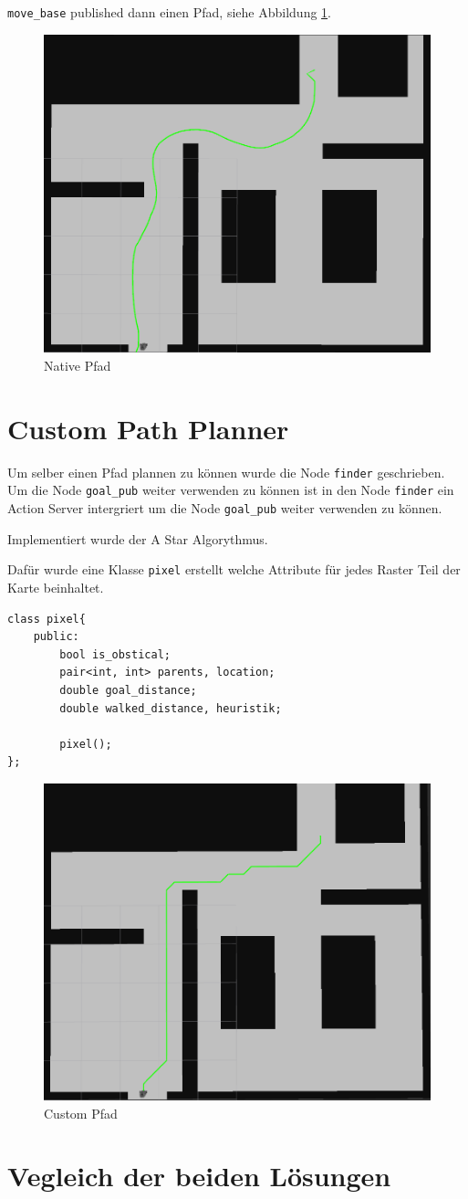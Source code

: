 \documentclass{article}
\begin{document}
\verb|move_base| published dann einen Pfad, siehe Abbildung \ref{path_nativ}.

\begin{figure}[!htbp]
    \centering
    \includegraphics[width=0.5\linewidth]{PICs/nativ_rviz_plan.png}
    \caption{Native Pfad}\label{path_nativ}
\end{figure}

\section{Custom Path Planner}

Um selber einen Pfad plannen zu können wurde die Node \verb|finder| geschrieben.
Um die Node \verb|goal_pub| weiter verwenden zu können ist in den Node \verb|finder| ein Action Server intergriert um die Node \verb|goal_pub| weiter verwenden zu können.

Implementiert wurde der A Star Algorythmus.\newline

Dafür wurde eine Klasse \texttt{pixel} erstellt welche Attribute für jedes Raster Teil der Karte beinhaltet.

\begin{lstlisting}
class pixel{
    public:
        bool is_obstical;
        pair<int, int> parents, location;
        double goal_distance;
        double walked_distance, heuristik;

        pixel();
};
\end{lstlisting}

\begin{figure}[!htbp]
    \centering
    \includegraphics[width=0.5\linewidth]{PICs/custom_rviz_plan.png}
    \caption{Custom Pfad}\label{path_custom}
\end{figure}

\section{Vegleich der beiden Lösungen}
\end{document}
